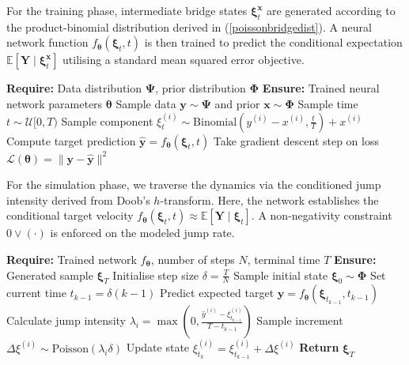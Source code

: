 \documentclass{article}
\theoremstyle{definition}
\begin{document}
For the training phase, intermediate bridge states $\boldsymbol{\xi}^{\boldsymbol{x}}_t$ are generated according to the product-binomial distribution derived in (\ref{poissonbridgedist}). A neural network function $f_{\boldsymbol{\theta}}(\boldsymbol{\xi}_t, t)$ is then trained to predict the conditional expectation $\mathbb{E}[\boldsymbol{Y} \mid \boldsymbol{\xi}^{\boldsymbol{x}}_t]$ utilising a standard mean squared error objective.

\begin{algorithm}[H]
\caption{Poisson Bridge Training}
\begin{algorithmic}[1]
\State \textbf{Require:} Data distribution $\boldsymbol{\Psi}$, prior distribution $\boldsymbol{\Phi}$
\State \textbf{Ensure:} Trained neural network parameters $\boldsymbol{\theta}$
    \State Sample data $\boldsymbol{y} \sim \boldsymbol{\Psi}$ and prior $\boldsymbol{x} \sim \boldsymbol{\Phi}$
    \State Sample time $t \sim \mathcal{U}[0, T)$
        \State Sample component $\xi_t^{(i)} \sim \text{Binomial}\left(y^{(i)} - x^{(i)}, \frac{t}{T}\right) + x^{(i)}$
    \EndFor
    \State Compute target prediction $\hat{\boldsymbol{y}} = f_{\boldsymbol{\theta}}(\boldsymbol{\xi}_t, t)$
    \State Take gradient descent step on loss $\mathcal{L}(\boldsymbol{\theta}) = \| \boldsymbol{y} - \hat{\boldsymbol{y}} \|^2$
\EndWhile
\end{algorithmic}
\end{algorithm}

For the simulation phase, we traverse the dynamics via the conditioned jump intensity derived from Doob's $h$-transform. Here, the network establishes the conditional target velocity $f_{\boldsymbol{\theta}}(\boldsymbol{\xi}_t, t) \approx \mathbb{E}[\boldsymbol{Y} \mid \boldsymbol{\xi}_t]$. A non-negativity constraint $0 \vee (\cdot)$ is enforced on the modeled jump rate.

\begin{algorithm}[H]
\caption{Poisson Bridge Simulation}
\begin{algorithmic}[1]
\State \textbf{Require:} Trained network $f_{\boldsymbol{\theta}}$, number of steps $N$, terminal time $T$
\State \textbf{Ensure:} Generated sample $\boldsymbol{\xi}_T$
\State Initialise step size $\delta = \frac{T}{N}$
\State Sample initial state $\boldsymbol{\xi}_0 \sim \boldsymbol{\Phi}$
    \State Set current time $t_{k-1} = \delta(k-1)$
    \State Predict expected target $\hat{\boldsymbol{y}} = f_{\boldsymbol{\theta}}(\boldsymbol{\xi}_{t_{k-1}}, t_{k-1})$
        \State Calculate jump intensity $\lambda_i = \max\left(0, \frac{\hat{y}^{(i)} - \xi_{t_{k-1}}^{(i)}}{T - t_{k-1}}\right)$
        \State Sample increment $\Delta \xi^{(i)} \sim \text{Poisson}(\lambda_i \delta)$
        \State Update state $\xi_{t_k}^{(i)} = \xi_{t_{k-1}}^{(i)} + \Delta \xi^{(i)}$
    \EndFor
\EndFor
\State \textbf{Return} $\boldsymbol{\xi}_T$
\end{algorithmic}
\end{algorithm}
\end{document}
